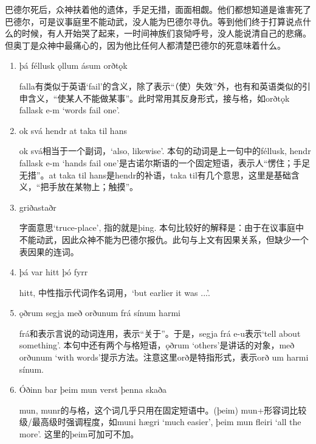 \begin{translation*}{}
  巴德尔死后，众神扶着他的遗体，手足无措，面面相觑。他们都想知道是谁害死了巴德尔，可是议事庭里不能动武，没人能为巴德尔寻仇。等到他们终于打算说点什么的时候，有人开始哭了起来，一时间神族们哀恸呼号，没人能说清自己的悲痛。但奥丁是众神中最痛心的，因为他比任何人都清楚巴德尔的死意味着什么。
\end{translation*}
\begin{grammar*}{}
  \begin{enumerate}[leftmargin=*]
    \item þá féllusk ǫllum ásum orðtǫk

          falla有类似于英语`fail'的含义，除了表示“（使）失效”外，也有和英语类似的引申含义，“使某人不能做某事”。此时常用其反身形式，接与格，如orðtǫk fallask e-m `words fail one'.

    \item ok svá hendr at taka til hans

          ok svá相当于一个副词，`also, likewise'. 本句的动词是上一句中的féllusk, hendr fallask e-m `hands fail one'是古诺尔斯语的一个固定短语，表示人“愣住；手足无措”。at taka til hans是hendr的补语，taka til有几个意思，这里是基础含义，“把手放在某物上；触摸”。

    \item griðastaðr

          字面意思`truce-place', 指的就是þing. 本句比较好的解释是：由于在议事庭中不能动武，因此众神不能为巴德尔报仇。此句与上文有因果关系，但缺少一个表因果的连词。

    \item þá var hitt þó fyrr

          hitt, 中性指示代词作名词用，`but earlier it was ...'.

    \item ǫðrum segja með orðunum frá sínum harmi

          frá和表示言说的动词连用，表示“关于”。于是，segja frá e-u表示`tell about something'. 本句中还有两个与格短语，ǫðrum `others'是讲话的对象，með orðunum `with words'提示方法。注意这里orð是特指形式，表示orð um harmi sínum.

    \item Óðinn bar þeim mun verst þenna skaða

          mun, munr的与格，这个词几乎只用在固定短语中。(þeim) mun+形容词比较级/最高级时强调程度，如muni hægri `much easier', þeim mun fleiri `all the more'. 这里的þeim可加可不加。
  \end{enumerate}
\end{grammar*}
